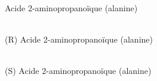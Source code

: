 \documentclass{article}
\begin{document}
\begin{center}
\\
Acide 2-aminopropanoïque (alanine)
\end{center}
\vfill

\begin{center}
\\
(R) Acide 2-aminopropanoïque (alanine)
\end{center}
\vfill

\begin{center}
\\
(S) Acide 2-aminopropanoïque (alanine)
\end{center}
\vfill
\end{document}
